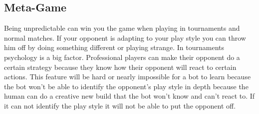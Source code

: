 \subsection{Meta-Game}		
		Being unpredictable can win you the game when playing in tournaments and normal matches. 
		If your opponent is adapting to your play style you can throw him off by doing something different or playing strange.
		In tournaments psychology is a big factor. Professional players can make their opponent do a certain strategy because they know 
		how their opponent will react to certain actions. This feature will be hard or nearly impossible for a bot to learn because the bot won't be able to 
		identify the opponent's play style in depth because the human can do a creative new build that the bot won't know and can't react to. 
		If it can not identify the play style it will not be able to put the opponent off. \\

